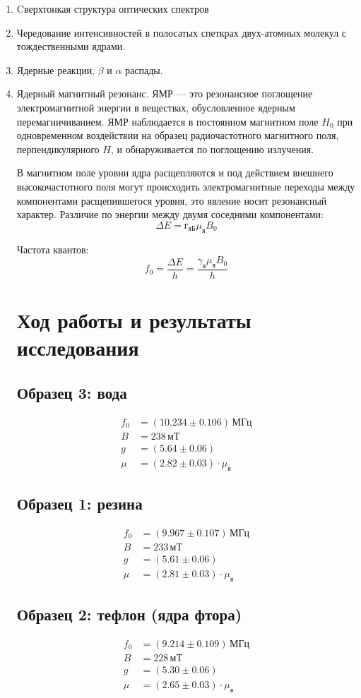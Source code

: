 \documentclass[12pt]{article}
\begin{document}
\begin{enumerate}
	\item 
		Cверхтонкая структура оптических спектров
	\item
		Чередование интенсивностей в полосатых спеткрах двух-атомных молекул с тождественными ядрами.
	\item
		Ядерные реакции, $\beta$ и $\alpha$ распады.
	\item
		Ядерный магнитный резонанс. ЯМР --- это резонансное поглощение электромагнитной энергии в веществах, обусловленное ядерным перемагничиванием. ЯМР наблюдается в постоянном магнитном поле $H_0$ при одновременном воздействии на образец радиочастотного магнитного поля, перпендикулярного $H$, и обнаруживается по поглощению излучения.
	\par
		В магнитном поле уровни ядра расщепляются и под действием внешнего высокочастотного поля могут происходить электромагнитные переходы между компонентами расщепившегося уровня, это явление носит резонансный характер. Различие по энергии между двумя соседними компонентами:
\[
	\Delta E = \text{г}_\text{яБ} \mu_\text{я} B_0
\]
\par
	Частота квантов:
\[
	f_0 = \frac{\Delta E}{h} = \frac{\gamma_\text{я} \mu_\text{я} B_0}{h}
\]

\section*{Ход работы и результаты исследования}

\subsection*{Образец 3: вода}
\begin{align*}
	f_0 &= \left(10.234 \pm 0.106\right) \, \text{МГц} \\
	B &= 238 \, \text{мТ} \\
	g &= \left(5.64 \pm 0.06\right) \\
	\mu &= \left(2.82 \pm  0.03\right) \cdot \mu_\text{я}
\end{align*}

\subsection*{Образец 1: резина}
\begin{align*}
	f_0 &= \left(9.967 \pm 0.107\right) \, \text{МГц} \\
	B &= 233 \, \text{мТ} \\
	g &= \left(5.61 \pm 0.06\right) \\
	\mu &= \left(2.81 \pm  0.03\right) \cdot \mu_\text{я}
\end{align*}

\subsection*{Образец 2: тефлон (ядра фтора)}
\begin{align*}
	f_0 &= \left(9.214 \pm 0.109\right) \, \text{МГц} \\
	B &= 228 \, \text{мТ} \\
	g &= \left(5.30 \pm 0.06\right) \\
	\mu &= \left(2.65 \pm  0.03\right) \cdot \mu_\text{я}
\end{align*}


\end{enumerate}
\end{document}
